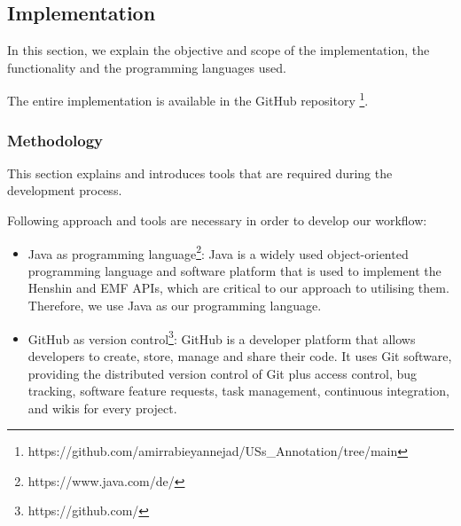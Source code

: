 \subsection{Implementation}\label{redundancy_implementation}
In this section, we explain the objective and scope of the implementation, the functionality and the programming languages used.

The entire implementation is available in the GitHub repository \footnote{https://github.com/amirrabieyannejad/USs\_Annotation/tree/main}.
\subsubsection*{Methodology}
This section explains and introduces tools that are required during the development process.

Following approach and tools are necessary in order to develop our workflow:
\begin{itemize}	
	\item Java as programming language\footnote{https://www.java.com/de/}: Java is a widely used object-oriented programming language and software platform that is used to implement the Henshin and EMF APIs, which are critical to our approach to utilising them. Therefore, we use Java as our programming language.
	
	\item GitHub as version control\footnote{https://github.com/}: GitHub is a developer platform that allows developers to create, store, manage and share their code. It uses Git software, providing the distributed version control of Git plus access control, bug tracking, software feature requests, task management, continuous integration, and wikis for every project.
\end{itemize} 
